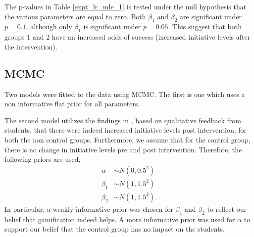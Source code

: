 \documentclass[12pt,a4paper]{article}
\numberwithin{theorem}{section}
\begin{document}
The p-values in Table \ref{expt_lr_mle_1} is tested
under the null hypothesis that the various parameters
are equal to zero. Both $\beta_1$ and $\beta_2$ are
significant under $p = 0.1$, although only $\beta_1$ is
significant under $p = 0.05$. This suggest that 
both groups $1$ and $2$ have an increased odds of 
success (increased initiative levels after the intervention).

\subsection{MCMC}

Two models were fitted to the data using MCMC. The first
is one which uses a non informative flat prior for all 
parameters. 

The second model utilizes the findings in
\cite{ang2020gamifying}, based on qualitative feedback
from students, that there were indeed increased initiative
levels post intervention, for both the non control groups.  
Furthermore, we assume that for the control group, there
is no change in initiative levels pre and post intervention. 
Therefore, the following priors are used,
\begin{equation}\label{eq_inform_prior_game_exp}
\begin{split}
\alpha&\sim N(0,0.5^2)\\
\beta_1&\sim N(1,1.5^2)\\
\beta_2&\sim N(1,1.5^2).
\end{split}
\end{equation}
In particular, a weakly informative prior was chosen for
$\beta_1$ and $\beta_2$ to reflect our belief that
 gamification indeed helps. A more informative prior
 was used for $\alpha$ to support our belief that 
 the control group has no impact on the students. 
 



\end{document}
